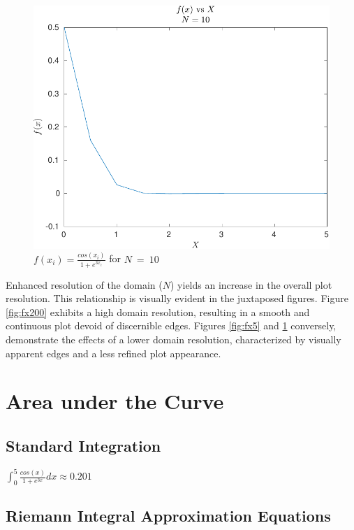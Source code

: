 \documentclass[12pt, a4paper]{article}
\begin{document}
			\begin{figure}[H]
				\centering
				\includegraphics[width=1\linewidth]{Code/Fig/fx_10.pdf}
				\caption{\Large $f(x_{i}) = \frac{cos(x_{i})}{1 + e^{3x_{i}}}$ for $N \ = \ 10$}
				\label{fig:fx10}
			\end{figure}
			Enhanced resolution of the domain ($N$) yields an increase in the overall plot resolution. This relationship is visually evident in the juxtaposed figures. Figure \ref{fig:fx200} exhibits a high domain resolution, resulting in a smooth and continuous plot devoid of discernible edges. Figures \ref{fig:fx5} and \ref{fig:fx10} conversely, demonstrate the effects of a lower domain resolution, characterized by visually apparent edges and a less refined plot appearance. 
			
	\section {Area under the Curve}
		\subsection{Standard Integration}
			
			\begin{center}
				\LARGE $\int_{0}^{5} \frac{cos(x)}{1 + e^{3x}} dx \approx 0.201$
			\end{center}
			
		\subsection{Riemann Integral Approximation Equations}
\end{document}
